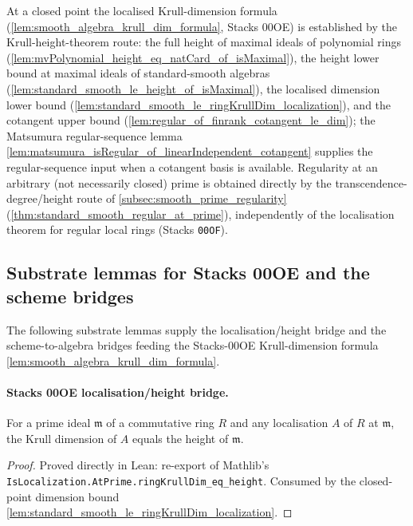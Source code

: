At a closed point the localised Krull-dimension formula
(\cref{lem:smooth_algebra_krull_dim_formula}, Stacks 00OE) is established by the
Krull-height-theorem route: the full height of maximal ideals of polynomial
rings (\cref{lem:mvPolynomial_height_eq_natCard_of_isMaximal}), the height
lower bound at maximal ideals of standard-smooth algebras
(\cref{lem:standard_smooth_le_height_of_isMaximal}), the localised dimension
lower bound (\cref{lem:standard_smooth_le_ringKrullDim_localization}), and the
cotangent upper bound (\cref{lem:regular_of_finrank_cotangent_le_dim}); the
Matsumura regular-sequence lemma
\cref{lem:matsumura_isRegular_of_linearIndependent_cotangent} supplies the
regular-sequence input when a cotangent basis is available. Regularity at an
arbitrary (not necessarily closed) prime is obtained directly by the
transcendence-degree/height route of \cref{subsec:smooth_prime_regularity}
(\cref{thm:standard_smooth_regular_at_prime}), independently of the localisation
theorem for regular local rings (Stacks \texttt{00OF}).

\subsection{Substrate lemmas for Stacks 00OE and the scheme bridges}
\label{subsec:codim1_substrate_lemmas}

The following substrate lemmas supply the localisation/height bridge and the
scheme-to-algebra bridges feeding the Stacks-00OE Krull-dimension formula
\cref{lem:smooth_algebra_krull_dim_formula}.

\paragraph{Stacks 00OE localisation/height bridge.}

\begin{lemma}
  \label{lem:ringKrullDim_localization_eq_height_atPrime}
  For a prime ideal \(\mathfrak m\) of a commutative ring \(R\) and any localisation
  \(A\) of \(R\) at \(\mathfrak m\), the Krull dimension of \(A\) equals the height of
  \(\mathfrak m\).
\end{lemma}

\begin{proof}
  Proved directly in Lean: re-export of Mathlib's
  \texttt{IsLocalization.AtPrime.ringKrullDim\_eq\_height}. Consumed by the
  closed-point dimension bound
  \cref{lem:standard_smooth_le_ringKrullDim_localization}.
\end{proof}

